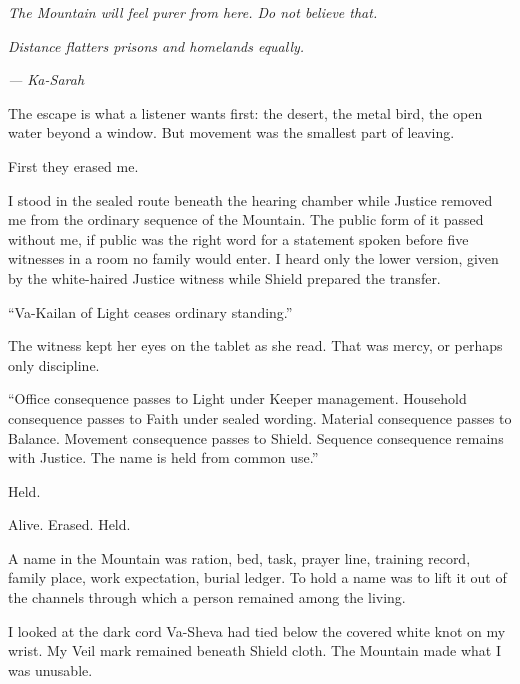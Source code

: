 

\textit{The Mountain will feel purer from here. Do not believe that.}\par
\textit{Distance flatters prisons and homelands equally.}\par
\textit{--- Ka-Sarah}\par

\ornament

The escape is what a listener wants first: the desert, the metal bird, the open water beyond a window. But movement was the smallest part of leaving.\par

First they erased me.\par

\ornament

I stood in the sealed route beneath the hearing chamber while Justice removed me from the ordinary sequence of the Mountain. The public form of it passed without me, if public was the right word for a statement spoken before five witnesses in a room no family would enter. I heard only the lower version, given by the white-haired Justice witness while Shield prepared the transfer.\par

``Va-Kailan of Light ceases ordinary standing.''\par

The witness kept her eyes on the tablet as she read. That was mercy, or perhaps only discipline.\par

``Office consequence passes to Light under Keeper management. Household consequence passes to Faith under sealed wording. Material consequence passes to Balance. Movement consequence passes to Shield. Sequence consequence remains with Justice. The name is held from common use.''\par

Held.\par

Alive. Erased. Held.\par

A name in the Mountain was ration, bed, task, prayer line, training record, family place, work expectation, burial ledger. To hold a name was to lift it out of the channels through which a person remained among the living.\par

I looked at the dark cord Va-Sheva had tied below the covered white knot on my wrist. My Veil mark remained beneath Shield cloth. The Mountain made what I was unusable.\par

